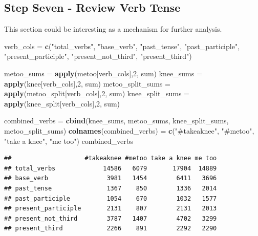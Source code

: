 \documentclass[]{article}
\newenvironment{Shaded}{\begin{snugshade}}{\end{snugshade}}
\newcommand{\KeywordTok}[1]{\textcolor[rgb]{0.13,0.29,0.53}{\textbf{#1}}}
\newcommand{\DecValTok}[1]{\textcolor[rgb]{0.00,0.00,0.81}{#1}}
\newcommand{\StringTok}[1]{\textcolor[rgb]{0.31,0.60,0.02}{#1}}
\newcommand{\NormalTok}[1]{#1}
\begin{document}
\subsection{Step Seven - Review Verb
Tense}\label{step-seven---review-verb-tense}

This section could be interesting as a mechanism for further analysis.

\begin{Shaded}
\begin{Highlighting}[]
\NormalTok{verb_cols =}\StringTok{ }\KeywordTok{c}\NormalTok{(}\StringTok{"total_verbs"}\NormalTok{, }\StringTok{"base_verb"}\NormalTok{, }\StringTok{"past_tense"}\NormalTok{,  }\StringTok{"past_participle"}\NormalTok{, }\StringTok{"present_participle"}\NormalTok{, }\StringTok{"present_not_third"}\NormalTok{, }\StringTok{"present_third"}\NormalTok{)}

\NormalTok{metoo_sums =}\StringTok{ }\KeywordTok{apply}\NormalTok{(metoo[verb_cols],}\DecValTok{2}\NormalTok{, sum) }
\NormalTok{knee_sums =}\StringTok{ }\KeywordTok{apply}\NormalTok{(knee[verb_cols],}\DecValTok{2}\NormalTok{, sum)}
\NormalTok{metoo_split_sums =}\StringTok{ }\KeywordTok{apply}\NormalTok{(metoo_split[verb_cols],}\DecValTok{2}\NormalTok{, sum) }
\NormalTok{knee_split_sums =}\StringTok{ }\KeywordTok{apply}\NormalTok{(knee_split[verb_cols],}\DecValTok{2}\NormalTok{, sum)}

\NormalTok{combined_verbs =}\StringTok{ }\KeywordTok{cbind}\NormalTok{(knee_sums, metoo_sums, knee_split_sums, metoo_split_sums)}
\KeywordTok{colnames}\NormalTok{(combined_verbs) =}\StringTok{ }\KeywordTok{c}\NormalTok{(}\StringTok{"#takeaknee"}\NormalTok{, }\StringTok{"#metoo"}\NormalTok{, }\StringTok{"take a knee"}\NormalTok{, }\StringTok{"me too"}\NormalTok{)}
\NormalTok{combined_verbs}
\end{Highlighting}
\end{Shaded}

\begin{verbatim}
##                    #takeaknee #metoo take a knee me too
## total_verbs             14586   6079       17904  14889
## base_verb                3981   1454        6411   3696
## past_tense               1367    850        1336   2014
## past_participle          1054    670        1032   1577
## present_participle       2131    807        2131   2013
## present_not_third        3787   1407        4702   3299
## present_third            2266    891        2292   2290
\end{verbatim}
\end{document}
